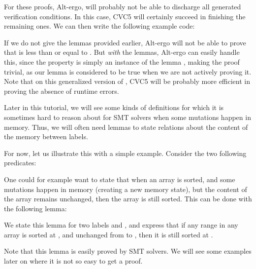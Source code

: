 


For these proofs, Alt-ergo, will probably not be able to discharge all
generated verification conditions. In this case, CVC5 will certainly succeed
in finishing the remaining ones. We can then write the following example code:






If we do not give the lemmas provided earlier, Alt-ergo will not be able
to prove that  is less than or equal to
. But \emph{with} the lemmas, Alt-ergo can easily handle this, since the
property is simply an instance of the lemma
, making the proof trivial, as our lemma is
considered to be true when we are not actively proving it. Note that on this
generalized version of , CVC5 will be probably more
efficient in proving the absence of runtime errors.




Later in this tutorial, we will see some kinds of definitions for which it is
sometimes hard to reason about for SMT solvers when some mutations happen in
memory. Thus, we will often need lemmas to state relations about the content
of the memory between labels.


For now, let us illustrate this with a simple example. Consider the two following
predicates:




One could for example want to state that when an array is sorted, and some
mutations happen in memory (creating a new memory state), but the content of the
array remains unchanged, then the array is still sorted. This can be done with
the following lemma:




We state this lemma for two labels  and , and
express that if any range in any array is sorted at , and
unchanged from  to , then it is still sorted at
.


Note that this lemma is easily proved by SMT solvers. We will see some
examples later on where it is not so easy to get a proof.




